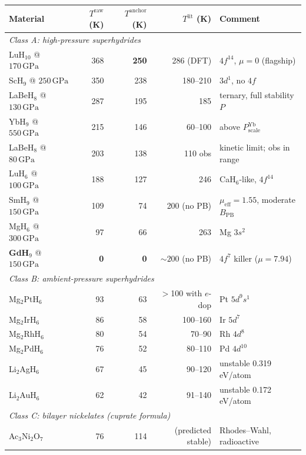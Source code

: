 \documentclass[11pt,a4paper]{article}
\newcommand{\BPB}{B_{\mathrm{PB}}}
\newcommand{\GPa}{\,\mathrm{GPa}}
\begin{document}
\begin{table}[h]
\centering
\small
\begin{tabular}{@{}l r r r l@{}}
\toprule
Material & $T^{\mathrm{raw}}$ (K) & $T^{\mathrm{anchor}}$ (K)
         & $T^{\mathrm{lit}}$ (K) & Comment \\
\midrule
\multicolumn{5}{l}{\textit{Class A: high-pressure superhydrides}} \\[1pt]
LuH$_{10}$ @ $170\GPa$  & 368 & \textbf{250} & 286 (DFT) & $4f^{14}$, $\mu=0$ (flagship) \\
ScH$_{9}$  @ $250\GPa$  & 350 & 238          & 180--210  & $3d^{1}$, no $4f$  \\
LaBeH$_{8}$ @ $130\GPa$ & 287 & 195          & 185       & ternary, full stability $P$ \\
YbH$_{9}$  @ $550\GPa$  & 215 & 146          & 60--100   & above $P_{\mathrm{scale}}^{\mathrm{Yb}}$ \\
LaBeH$_{8}$ @ $80\GPa$  & 203 & 138          & 110 obs   & kinetic limit; obs in range \\
LuH$_{6}$  @ $100\GPa$  & 188 & 127          & 246       & CaH$_{6}$-like, $4f^{14}$ \\
SmH$_{9}$  @ $150\GPa$  & 109 & 74           & 200 (no PB)& $\mu_{\mathrm{eff}}=1.55$, moderate $\BPB$ \\
MgH$_{6}$  @ $300\GPa$  & 97  & 66           & 263       & Mg $3s^{2}$ \\
\textbf{GdH$_{9}$}  @ $150\GPa$ & \textbf{0} & \textbf{0} & $\sim\!200$ (no PB) & $4f^{7}$ killer ($\mu=7.94$) \\
\midrule
\multicolumn{5}{l}{\textit{Class B: ambient-pressure superhydrides}} \\[1pt]
Mg$_{2}$PtH$_{6}$    & 93 & 63 & $>$100 with $e$-dop & Pt $5d^{9}s^{1}$ \\
Mg$_{2}$IrH$_{6}$    & 86 & 58 & 100--160  & Ir $5d^{7}$ \\
Mg$_{2}$RhH$_{6}$    & 80 & 54 & 70--90    & Rh $4d^{8}$ \\
Mg$_{2}$PdH$_{6}$    & 76 & 52 & 80--110   & Pd $4d^{10}$ \\
Li$_{2}$AgH$_{6}$    & 67 & 45 & 90--120   & unstable 0.319 eV/atom \\
Li$_{2}$AuH$_{6}$    & 62 & 42 & 91--140   & unstable 0.172 eV/atom \\
\midrule
\multicolumn{5}{l}{\textit{Class C: bilayer nickelates (cuprate formula)}} \\[1pt]
Ac$_{3}$Ni$_{2}$O$_{7}$     & 76 & 114 & (predicted stable) & Rhodes--Wahl, radioactive \\

\end{tabular}
\end{table}
\end{document}

